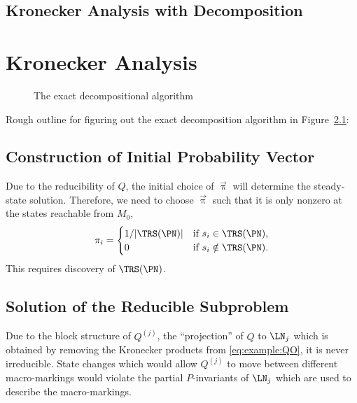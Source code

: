 \section{Kronecker Analysis with Decomposition}

\chapter{Kronecker Analysis}

\begin{figure}
  {\centering
    
    \par}
  \caption{The exact decompositional algorithm}
  \label{fig:kronecker:flowchart}
\end{figure}

Rough outline for figuring out the exact decomposition algorithm
\citep{bao2008decompositional} in Figure~\ref{fig:kronecker:flowchart}:

\section{Construction of Initial Probability Vector}

Due to the reducibility of $Q$, the initial choice of $\vec{\uppi}$ will
determine the steady-state solution. Therefore, we need to choose
$\vec{\uppi}$ such that it is only nonzero at the states reachable from
$M_0$,
\begin{equation}
  \pi_i = \begin{cases}
    1 / \lvert \TRS(\PN) \rvert & \text{if $s_i \in \TRS(\PN)$,} \\
    0 & \text{if $s_i \notin \TRS(\PN)$.} \\
  \end{cases}
\end{equation}
This requires discovery of $\TRS(\PN)$.

\section{Solution of the Reducible Subproblem}

Due to the block structure of $Q^{(j)}$, the ``projection'' of $Q$ to
$\LN_j$ which is obtained by removing the Kronecker products from
\eqref{eq:example:QO}, it is never irreducible. State changes which
would allow $Q^{(j)}$ to move between different macro-markings would violate
the partial $P$-invariants of $\LN_j$ which are used to describe the
macro-markings.

